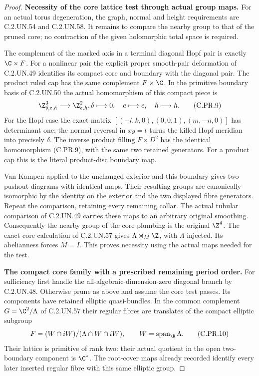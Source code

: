 \begin{proof}
\par\medskip\noindent\textbf{Necessity of the core lattice test through actual group maps.}
For an actual torus degeneration, the graph, normal and height
requirements are C.2.UN.54 and C.2.UN.58. It remains to compare
the nearby group to that of the pruned core; no contraction of
the given holomorphic total space is required.

The complement of the marked axis in a terminal diagonal Hopf
pair is exactly $\C\times F$. For a nonlinear pair the explicit
proper smooth-pair deformation of C.2.UN.49 identifies its compact
core and boundary with the diagonal pair. The product ruled cap
has the same complement $F\times\C$. In the primitive boundary
basis of C.2.UN.50 the actual homomorphism of this compact
piece is
\[
        \Z^3_{\delta,e,h}\longrightarrow\Z^2_{e,h},
                  \delta\longmapsto0,\quad
                  e\longmapsto e,\quad h\longmapsto h. \tag{C.PR.9}
\]
For the Hopf case the exact matrix
$[(-l,k,0),(0,0,1),(m,-n,0)]$ has determinant one;
the normal reversal in $xy=t$ turns the killed Hopf meridian
into precisely $\delta$. The inverse product filling
$F\times D^2$ has the identical homomorphism (C.PR.9),
with the same two retained generators. For a product cap this
is the literal product-disc boundary map.

Van Kampen applied to the unchanged exterior and this boundary
gives two pushout diagrams with identical maps. Their resulting
groups are canonically isomorphic by the identity on the exterior
and the two displayed fibre generators. Repeat the comparison,
retaining every remaining collar. The actual tubular comparison
of C.2.UN.49 carries these maps to an arbitrary original smoothing.
Consequently the nearby group of the core plumbing is the
original $\Z^4$. The exact core calculation of C.2.UN.57 gives
$\Lambda\rtimes_M\Z$, with $\Lambda$ injected. Its abelianness
forces $M=I$. This proves necessity using the actual maps needed
for the test.

\par\medskip\noindent\textbf{The compact core family with a prescribed remaining period order.}
For sufficiency first handle the all-algebraic-dimension-zero
diagonal branch by C.2.UN.48. Otherwise prune as above and assume
the core test passes. Its components have retained elliptic
quasi-bundles. In the common complement
$G=\C^2/\Lambda$ of C.2.UN.57 their regular fibres are translates
of the compact elliptic subgroup
\[
       F=(W\cap iW)/(\Lambda\cap W\cap iW),
                     \qquad W=\operatorname{span}_{\R}\Lambda.
                                                        \tag{C.PR.10}
\]
Their lattice is primitive of rank two: their actual quotient
in the open two-boundary component is $\C^*$.
The root-cover maps already recorded identify every later
inserted regular fibre with this same elliptic group.


\end{proof}

